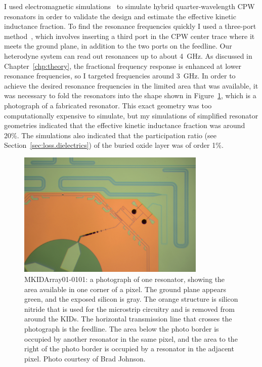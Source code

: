 I used electromagnetic simulations~\autocite{Sonnet} to simulate hybrid quarter-wavelength CPW resonators in order to validate the design and estimate the effective kinetic inductance fraction.
To find the resonance frequencies quickly I used a three-port method~\autocite{Wisbey2014JLTP}, which involves inserting a third port in the CPW center trace where it meets the ground plane, in addition to the two ports on the feedline.
Our heterodyne system can read out resonances up to about \SI{4}{GHz}.
As discussed in Chapter~\ref{chp:theory}, the fractional frequency response is enhanced at lower resonance frequencies, so I targeted frequencies around \SI{3}{GHz}.
In order to achieve the desired resonance frequencies in the limited area that was available, it was necessary to fold the resonators into the shape shown in Figure~\ref{fig:mkidarray01-0101_photo_one_resonator}, which is a photograph of a fabricated resonator.
This exact geometry was too computationally expensive to simulate, but my simulations of simplified resonator geometries indicated that the effective kinetic inductance fraction was around 20\%. 
The simulations also indicated that the participation ratio (see Section~\ref{sec:loss.dielectrics}) of the buried oxide layer was of order 1\%.

\begin{figure}[htb]
\centering
\includegraphics[width=0.8\textwidth]{multichroic/mkidarray01-0101_photo_one_resonator.jpg}
\caption[MKIDArray01-0101: a photograph of one resonator.]
{
MKIDArray01-0101: a photograph of one resonator, showing the area available in one corner of a pixel.
The ground plane appears green, and the exposed silicon is gray.
The orange structure is silicon nitride that is used for the microstrip circuitry and is removed from around the KIDs.
The horizontal transmission line that crosses the photograph is the feedline.
The area below the photo border is occupied by another resonator in the same pixel, and the area to the right of the photo border is occupied by a resonator in the adjacent pixel.
Photo courtesy of Brad Johnson.
}
\label{fig:mkidarray01-0101_photo_one_resonator}
\end{figure}

